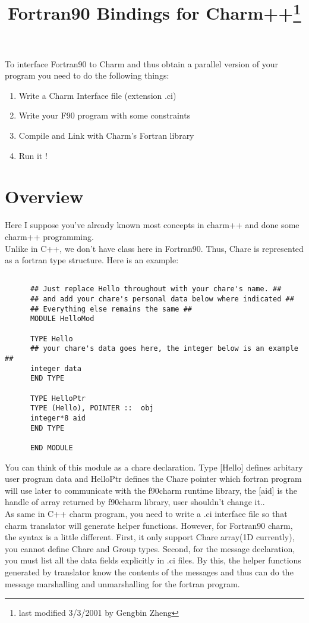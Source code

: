 \documentclass[11pt]{article}
\title{Fortran90 Bindings for Charm++\footnote{last modified 3/3/2001 by Gengbin Zheng}}
\begin{document}
\maketitle

To interface Fortran90 to Charm and thus obtain a parallel version of
your program you need to do the following things:
\begin{enumerate}
\item Write a Charm Interface file (extension .ci)
\item Write your F90 program with some constraints
\item Compile and Link with Charm's Fortran library
\item Run it !
\end{enumerate}

\section{Overview}

Here I suppose you've already known most concepts in charm++ and done some 
charm++ programming.  \\
Unlike in C++, we don't have class here in Fortran90. Thus, Chare is 
represented as a fortran type structure. Here is an example:

\begin{verbatim}

      ## Just replace Hello throughout with your chare's name. ##
      ## and add your chare's personal data below where indicated ##
      ## Everything else remains the same ##
      MODULE HelloMod

      TYPE Hello
      ## your chare's data goes here, the integer below is an example ##
      integer data
      END TYPE

      TYPE HelloPtr
      TYPE (Hello), POINTER ::  obj
      integer*8 aid
      END TYPE

      END MODULE
\end{verbatim}
You can think of this module as a chare declaration. Type [Hello] defines 
arbitary user program data and HelloPtr defines the Chare pointer which 
fortran program will use later to communicate with the f90charm runtime 
library, the [aid] is the handle of array returned by f90charm library, user 
shouldn't change it.. \\
As same in C++ charm program, you need to write a .ci interface file
so that charm translator will generate helper functions. However, for
Fortran90 charm, the syntax is a little different. First, it only support
Chare array(1D currently), you cannot define Chare and Group types. Second, 
for the message declaration, you must list all the data fields explicitly in
.ci files.  By this, the helper functions generated by translator know the 
contents of the messages and thus can do the message marshalling and 
unmarshalling for the fortran program. 
\end{document}
